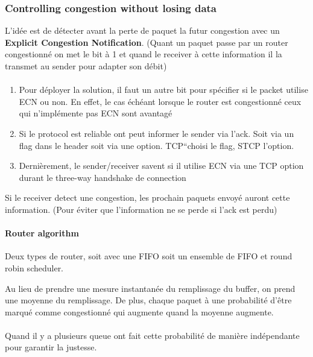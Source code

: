 \subsubsection{Controlling congestion without losing data}
L'idée est de détecter avant la perte de paquet la futur congestion avec un
\textbf{Explicit Congestion Notification}. (Quant un paquet passe par un router
congestionné on met le bit à 1 et quand le receiver à cette information il la
transmet au sender pour adapter son débit)

\paragraph{}
\begin{enumerate}
    \item Pour déployer la solution, il faut un autre bit pour spécifier si le packet utilise
        ECN ou non. En effet, le cas échéant lorsque le router est congestionné ceux qui
        n'implémente pas ECN sont avantagé
    \item Si le protocol est reliable ont peut informer le sender via l'ack. Soit via
        un flag dans le header soit via une option. TCP``choisi le flag, STCP l'option.
    \item Dernièrement, le sender/receiver savent si il utilise ECN via une TCP option
        durant le three-way handshake de connection
\end{enumerate}

Si le receiver detect une congestion, les prochain paquets envoyé auront cette information.
(Pour éviter que l'information ne se perde si l'ack est perdu)

\paragraph{Router algorithm}
Deux types de router, soit avec une FIFO soit un ensemble de FIFO et round robin scheduler.

Au lieu de prendre une mesure instantanée du remplissage du buffer, on prend une moyenne
du remplissage.
De plus, chaque paquet à une probabilité d'être marqué comme congestionné qui augmente
quand la moyenne augmente.

\paragraph{}
Quand il y a plusieurs queue ont fait cette probabilité de manière indépendante pour
garantir la justesse.

